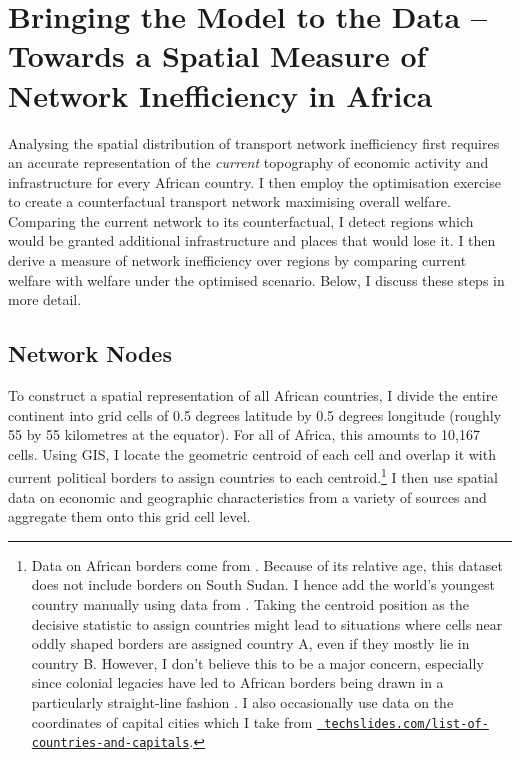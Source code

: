 \documentclass[11pt, oneside]{article}   	%
\begin{document}
\section{Bringing the Model to the Data -- Towards a Spatial Measure of Network Inefficiency in Africa}
\label{chapter:calibration}
Analysing the spatial distribution of transport network inefficiency first requires an accurate representation of the \emph{current} topography of economic activity and infrastructure for every African country. I then employ the \cite{Fajgelbaum_OptimalTransportNetworks_2017} optimisation exercise to create a counterfactual transport network maximising overall welfare. Comparing the current network to its counterfactual, I detect regions which would be granted additional infrastructure and places that would lose it. I then derive a measure of network inefficiency over regions by comparing current welfare with welfare under the optimised scenario. Below, I discuss these steps in more detail.

\subsection{Network Nodes}

To construct a spatial representation of all African countries, I divide the entire continent into grid cells of 0.5 degrees latitude by 0.5 degrees longitude (roughly 55 by 55 kilometres at the equator). For all of Africa, this amounts to 10,167 cells. Using GIS, I locate the geometric centroid of each cell and overlap it with current political borders to assign countries to each centroid.\footnote{Data on African borders come from \cite{Sandvik_WorldBordersDataset_2008}. Because of its relative age, this dataset does not include borders on South Sudan. I hence add the world's youngest country manually using data from \cite{OCHA_SouthSudanAdministrative_2017}. Taking the centroid position as the decisive statistic to assign countries might lead to situations where cells near oddly shaped borders are assigned country A, even if they mostly lie in country B. However, I don't believe this to be a major concern, especially since colonial legacies have led to African borders being drawn in a particularly straight-line fashion \citep[see][]{Alesina_ArtificialStates_2011}. I also occasionally use data on the coordinates of capital cities which I take from \href{http://techslides.com/list-of-countries-and-capitals}{\texttt{ techslides.com/list-of-countries-and-capitals}}.} I then use spatial data on economic and geographic characteristics from a variety of sources and aggregate them onto this grid cell level.
\end{document}

